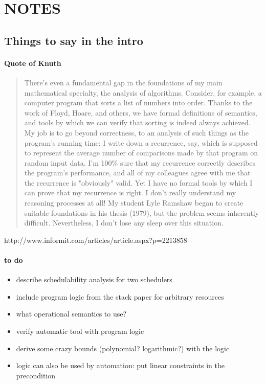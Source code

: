 \documentclass[nocopyrightspace,preprint]{sigplanconf}
\begin{document}
\section{NOTES}

\subsection{Things to say in the intro}

\paragraph{Quote of Knuth}

\begin{quotation}
  There's even a fundamental gap in the foundations of my main
  mathematical specialty, the analysis of algorithms. Consider, for
  example, a computer program that sorts a list of numbers into
  order. Thanks to the work of Floyd, Hoare, and others, we have
  formal definitions of semantics, and tools by which we can verify
  that sorting is indeed always achieved. My job is to go beyond
  correctness, to an analysis of such things as the program's running
  time: I write down a recurrence, say, which is supposed to represent
  the average number of comparisons made by that program on random
  input data. I'm 100\% sure that my recurrence correctly describes
  the program's performance, and all of my colleagues agree with me
  that the recurrence is "obviously" valid. Yet I have no formal tools
  by which I can prove that my recurrence is right. I don't really
  understand my reasoning processes at all! My student Lyle Ramshaw
  began to create suitable foundations in his thesis (1979), but the
  problem seems inherently difficult. Nevertheless, I don't lose any
  sleep over this situation.
\end{quotation}
http://www.informit.com/articles/article.aspx?p=2213858

\paragraph{to do}

\begin{itemize}
\item describe schedulability analysis for two schedulers
\item include program logic from the stack paper for arbitrary resources
\item what operational semantics to use? 
\item verify automatic tool with program logic
\item derive some crazy bounds (polynomial? logarithmic?) with the logic
\item logic can also be used by automation: put linear constraints in the precondition
\end{itemize}
\end{document}
